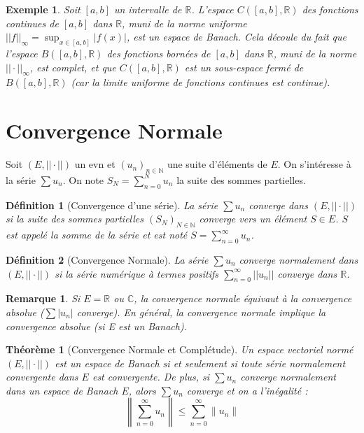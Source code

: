 \documentclass{article}
\newtheorem{theorem}{Théorème}
\newtheorem{definition}{Définition}
\newtheorem{remark}{Remarque}
\newtheorem{example}{Exemple}
\begin{document}
\begin{example}
Soit $[a, b]$ un intervalle de $\mathbb{R}$. L'espace $C([a, b], \mathbb{R})$ des fonctions continues de $[a, b]$ dans $\mathbb{R}$, muni de la norme uniforme $||f||_\infty = \sup_{x \in [a, b]} |f(x)|$, est un espace de Banach.
Cela découle du fait que l'espace $B([a, b], \mathbb{R})$ des fonctions bornées de $[a, b]$ dans $\mathbb{R}$, muni de la norme $|| \cdot ||_\infty$, est complet, et que $C([a, b], \mathbb{R})$ est un sous-espace fermé de $B([a, b], \mathbb{R})$ (car la limite uniforme de fonctions continues est continue).
\end{example}

\section{Convergence Normale}

Soit $(E, ||\cdot||)$ un evn et $(u_n)_{n\in\mathbb{N}}$ une suite d'éléments de $E$. On s'intéresse à la série $\sum u_n$. On note $S_N = \sum_{n=0}^N u_n$ la suite des sommes partielles.

\begin{definition}[Convergence d'une série]
La série $\sum u_n$ converge dans $(E, ||\cdot||)$ si la suite des sommes partielles $(S_N)_{N\in\mathbb{N}}$ converge vers un élément $S \in E$. $S$ est appelé la somme de la série et est noté $S = \sum_{n=0}^\infty u_n$.
\end{definition}

\begin{definition}[Convergence Normale]
La série $\sum u_n$ converge normalement dans $(E, ||\cdot||)$ si la série numérique à termes positifs $\sum_{n=0}^\infty ||u_n||$ converge dans $\mathbb{R}$.
\end{definition}

\begin{remark}
Si $E = \mathbb{R}$ ou $\mathbb{C}$, la convergence normale équivaut à la convergence absolue ($\sum |u_n|$ converge). En général, la convergence normale implique la convergence absolue (si E est un Banach).
\end{remark}

\begin{theorem}[Convergence Normale et Complétude]
Un espace vectoriel normé $(E, ||\cdot||)$ est un espace de Banach si et seulement si toute série normalement convergente dans $E$ est convergente.
De plus, si $\sum u_n$ converge normalement dans un espace de Banach $E$, alors $\sum u_n$ converge et on a l'inégalité :
\[
\left\| \sum_{n=0}^\infty u_n \right\| \le \sum_{n=0}^\infty \|u_n\|
\]
\end{theorem}
\end{document}
